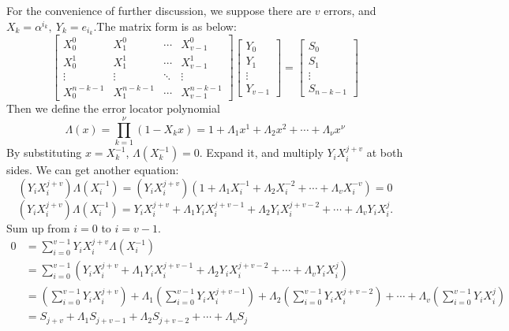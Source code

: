 \documentclass[12pt]{article}
\begin{document}
For the convenience of further discussion, we suppose there are $v$ errors, and $X_{k}=\alpha ^{i_{k}},\ Y_{k}=e_{i_{k}}$.The matrix form is as below:
\[ 		
\begin{bmatrix} 		
X_0^0 & X_1^0 & \cdots & X_{v-1}^0 \\ 
X_0^1 & X_1^1 & \cdots & X_{v-1}^1 \\
\vdots & \vdots & \ddots & \vdots \\
X_0^{n-k-1} & X_1^{n-k-1} & \cdots & X_{v-1}^{n-k-1}  		
\end{bmatrix} 		
\begin{bmatrix} 		
Y_0 \\ 
Y_1 \\ 
\vdots \\ 
Y_{v-1} 		
\end{bmatrix} 		
= 
\begin{bmatrix} 		
S_0 \\ 
S_1 \\ 
\vdots \\ 
S_{n-k-1} 		
\end{bmatrix} 		
\]
Then we define the error locator polynomial \begin{displaymath} \Lambda (x)=\prod _{k=1}^{\nu }(1-X_{k}x)=1+\Lambda _{1}x^{1}
+\Lambda _{2}x^{2}+\cdots +\Lambda _{\nu }x^{\nu }\end{displaymath}  
By substituting $x = X_{k}^{-1}$, $\Lambda (X_{k}^{-1}) = 0$. 
Expand it, and multiply $Y_i X_i^{j+v}$ at both sides. We can get another equation:
$$(Y_i X_i^{j+v}) \Lambda(X_i^{-1}) = (Y_i X_i^{j+v})(1 + \Lambda_1 X_i^{-1} + \Lambda_2 X_i^{-2} + \cdots + \Lambda_v X_i^{-v})= 0$$
$$(Y_i X_i^{j+v}) \Lambda(X_i^{-1}) = Y_i X_i^{j+v} + \Lambda_1 Y_i X_i^{j+v-1} + \Lambda_2 Y_i X_i^{j+v-2} + \cdots + \Lambda_v Y_i X_i^j.$$
Sum up from $i = 0 $ to $ i = v - 1$.
\begin{align*} 		
0   &= \sum_{i=0}^{v-1} Y_i X_i^{j+v} \Lambda(X_i^{-1}) \\ 		
    &= \sum_{i=0}^{v-1} \left( Y_i X_i^{j+v} + \Lambda_1 Y_i X_i^{j+v-1} + \Lambda_2 Y_i X_i^{j+v-2} + \cdots + \Lambda_v Y_i X_i^j \right) \\ 
    & = \left(\sum_{i=0}^{v-1} Y_i X_i^{j+v}\right) + \Lambda_1 \left(\sum_{i=0}^{v-1} Y_i X_i^{j+v-1}\right) + \Lambda_2 \left(\sum_{i=0}^{v-1} Y_i X_i^{j+v-2}\right) + \cdots + \Lambda_v \left(\sum_{i=0}^{v-1} Y_i X_i^j\right) \\ 		
    & = S_{j+v} + \Lambda_1 S_{j+v-1} + \Lambda_2 S_{j+v-2} + \cdots + \Lambda_v S_j
\end{align*}
\end{document}
